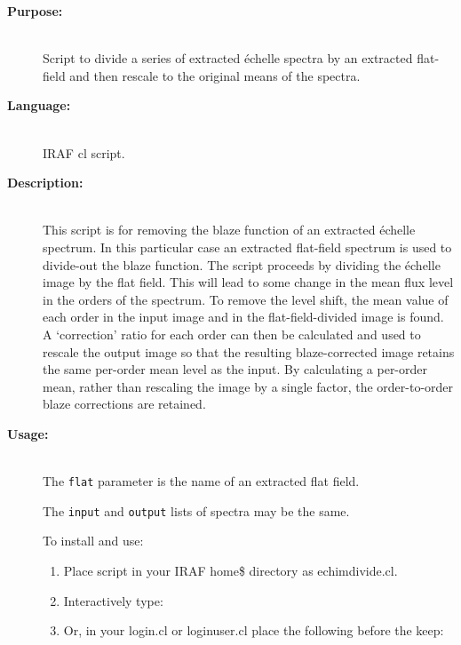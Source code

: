\documentclass[twoside,11pt]{starlink}
\begin{document}
\begin{description}

\item [\textbf{Purpose:}] \mbox{} \\
     Script to divide a series of extracted \'{e}chelle spectra by an
     extracted flat-field and then rescale to the original means of
     the spectra.

\item [\textbf{Language:}] \mbox{} \\
     IRAF cl script.

\item [\textbf{Description:}] \mbox{} \\
     This script is for removing the blaze function of an extracted
     \'{e}chelle spectrum.  In this particular case an extracted flat-field
     spectrum is used to divide-out the blaze function.
     The script proceeds by dividing the \'{e}chelle image by the flat field.
     This will lead to some change in the mean flux level in the
     orders of the spectrum.  To remove the level shift, the mean
     value of each order in the input image and in the flat-field-divided
     image is found.  A `correction' ratio for each order can then
     be calculated and used to rescale the output image so that the
     resulting blaze-corrected image retains the same per-order mean
     level as the input.  By calculating a per-order mean, rather than
     rescaling the image by a single factor, the order-to-order blaze
     corrections are retained.

\item [\textbf{Usage:}] \mbox{} \\
     The \verb+flat+ parameter is the name of an extracted flat field.

     The \verb+input+ and \verb+output+ lists of spectra may be the same.

     To install and use:

\begin{enumerate}

\item Place script in your IRAF home\$ directory as echimdivide.cl.

\item Interactively type:


\item Or, in your login.cl or loginuser.cl place the following
      before the keep:


\end{enumerate}
\end{description}
\end{document}
